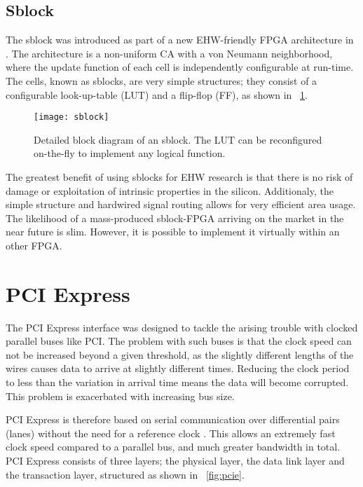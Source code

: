 \subsection{Sblock}
\label{sec:sblock}

The sblock was introduced as part of a new EHW-friendly FPGA architecture in \cite{haddow2000sblock}.
The architecture is a non-uniform CA with a von Neumann neighborhood, where the update function of each cell is independently configurable at run-time.
The cells, known as sblocks, are very simple structures; they consist of a configurable look-up-table (LUT) and a flip-flop (FF), as shown in \figurename~\ref{fig:sblock}.

\begin{figure}[!ht]
    \centering
    \texttt{[image: sblock]}
    \caption[Sblock]{
        Detailed block diagram of an sblock.
        The LUT can be reconfigured on-the-fly to implement any logical function.
    }
    \label{fig:sblock}
\end{figure}

The greatest benefit of using sblocks for EHW research is that there is no risk of damage or exploitation of intrinsic properties in the silicon.
Additionaly, the simple structure and hardwired signal routing allows for very efficient area usage.
The likelihood of a mass-produced sblock-FPGA arriving on the market in the near future is slim.
However, it is possible to implement it virtually within an other FPGA.


\section{PCI Express}

The PCI Express interface was designed to tackle the arising trouble with clocked parallel buses like PCI.
The problem with such buses is that the clock speed can not be increased beyond a given threshold, as the slightly different lengths of the wires causes data to arrive at slightly different times.
Reducing the clock period to less than the variation in arrival time means the data will become corrupted.
This problem is exacerbated with increasing bus size.

PCI Express is therefore based on serial communication over differential pairs (lanes\footnotemark) without the need for a reference clock \cite{pcie}.
This allows an extremely fast clock speed compared to a parallel bus, and much greater bandwidth in total.
PCI Express consists of three layers; the physical layer, the data link layer and the transaction layer, structured as shown in \figurename~\ref{fig:pcie}.

